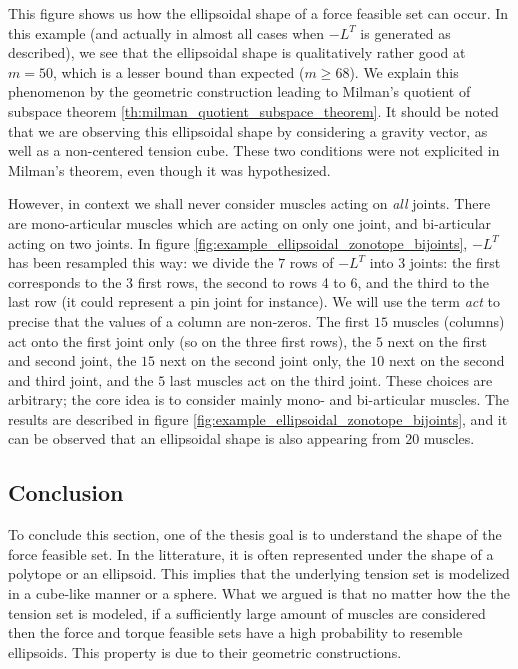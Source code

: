 This figure shows us how the ellipsoidal shape of a force feasible set can occur. In this example (and actually in almost all cases when $-L^T$ is generated as described), we see that the ellipsoidal shape is qualitatively rather good at $m=50$, which is a lesser bound than expected ($m\geq 68$). We explain this phenomenon by the geometric construction leading to Milman's quotient of subspace theorem \ref{th:milman_quotient_subspace_theorem}. It should be noted that we are observing this ellipsoidal shape by considering a gravity vector, as well as a non-centered tension cube. These two conditions were not explicited in Milman's theorem, even though it was hypothesized.

However, in context we shall never consider muscles acting on \emph{all} joints. There are mono-articular muscles which are acting on only one joint, and bi-articular acting on two joints. In figure \ref{fig:example_ellipsoidal_zonotope_bijoints}, $-L^T$ has been resampled this way: we divide the $7$ rows of $-L^T$ into 3 joints: the first corresponds to the 3 first rows, the second to rows 4 to 6, and the third to the last row (it could represent a pin joint for instance). We will use the term \emph{act} to precise that the values of a column are non-zeros.
The first $15$ muscles (columns) act onto the first joint only (so on the three first rows), the $5$ next on the first and second joint, the $15$ next on the second joint only, the $10$ next on the second and third joint, and the $5$ last muscles act on the third joint. These choices are arbitrary; the core idea is to consider mainly mono- and bi-articular muscles. The results are described in figure \ref{fig:example_ellipsoidal_zonotope_bijoints}, and it can be observed that an ellipsoidal shape is also appearing from $20$ muscles.

\subsection*{Conclusion}

To conclude this section, one of the thesis goal is to understand the shape of the force feasible set. In the litterature, it is often represented under the shape of a polytope or an ellipsoid. This implies that the underlying tension set is modelized in a cube-like manner or a sphere. What we argued is that no matter how the the tension set is modeled, if a sufficiently large amount of muscles are considered then the force and torque feasible sets have a high probability to resemble ellipsoids. This property is due to their geometric constructions.

